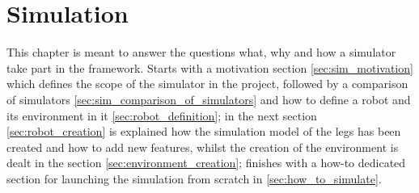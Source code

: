 
\chapter{Simulation} %
\label{cha:simulation}
This chapter is meant to answer the questions what, why and how a simulator take part in the framework.
Starts with a motivation section \ref{sec:sim_motivation} which defines the scope of the simulator
 in the project, followed by a comparison of simulators \ref{sec:sim_comparison_of_simulators} and how to define a robot and its environment in it \ref{sec:robot_definition}; in the next section \ref{sec:robot_creation} is explained how the simulation model of the legs has been created and how to add new features, whilst the creation of the environment is dealt in the section \ref{sec:environment_creation}; finishes with a how-to dedicated section for launching the simulation from scratch in \ref{sec:how_to_simulate}.








